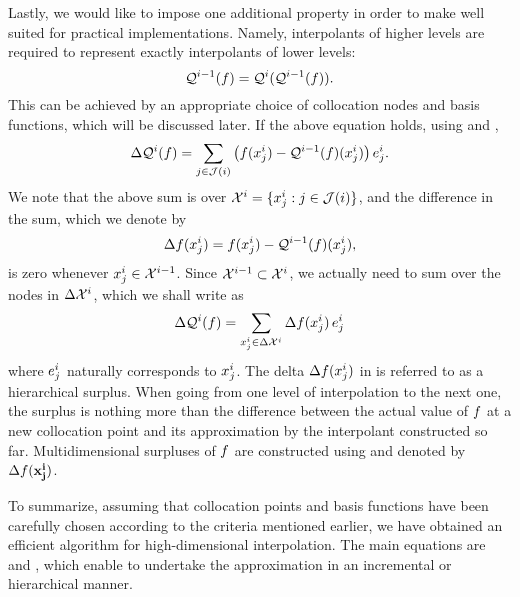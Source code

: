 Lastly, we would like to impose one additional property in order to make
 well suited for practical implementations. Namely,
interpolants of higher levels are required to represent exactly interpolants
of lower levels:
\begin{equation} \elab{tensor-exactness}
  \tensor{i - 1}(\f) = \tensor{i}(\tensor{i - 1}(\f)).
\end{equation}
This can be achieved by an appropriate choice of collocation nodes and basis
functions, which will be discussed later. If the above equation holds, using
 and ,
\[
  \Delta\mathcal{Q}^{i}(f) = \sum_{j \in \mathcal{J}(i)} \left(f(x^i_j) - \mathcal{Q}^{i - 1}(f)(x^i_j)\right) e^i_j.
\]
We note that the above sum is over $\mathcal{X}^i = \{ x^i_j: j \in \mathcal{J}(i) \}$, and
the difference in the sum, which we denote by
\begin{equation} \elab{surplus}
  \surplus(\x^i_j) = \f(\x^i_j) - \tensor{i - 1}(\f)(\x^i_j),
\end{equation}
is zero whenever $x^i_j \in \mathcal{X}^{i - 1}$. Since $\mathcal{X}^{i - 1} \subset \mathcal{X}^i$, we
actually need to sum over the nodes in $\Delta\mathcal{X}^i$, which we shall write as
\begin{equation} \elab{tensor-surplus}
  \Delta\tensor{i}(\f) = \sum_{\x^i_j \in \Delta\X^i} \surplus(\x^i_j) \, \e^i_j
\end{equation}
where $e^i_j$ naturally corresponds to $x^i_j$. The delta $\Delta f(x^i_j)$
in  is referred to as a hierarchical surplus. When going from one
level of interpolation to the next one, the surplus is nothing more than the
difference between the actual value of $f$ at a new collocation point and its
approximation by the interpolant constructed so far. Multidimensional surpluses
of $f$ are constructed using  and 
denoted by $\Delta f(\mathbf{x}^{\mathbf{i}}_{\mathbf{j}})$.

To summarize, assuming that collocation points and basis functions have been
carefully chosen according to the criteria mentioned earlier, we have obtained
an efficient algorithm for high-dimensional interpolation. The main equations
are  and , which enable to
undertake the approximation in an incremental or hierarchical manner.
